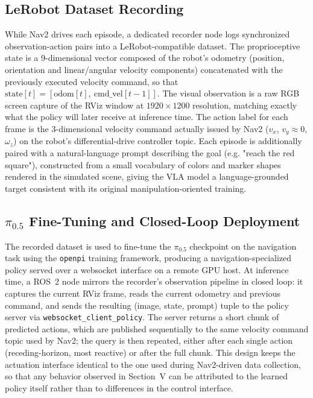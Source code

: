 \documentclass[conference]{IEEEtran}
\begin{document}
\subsection{LeRobot Dataset Recording}
While Nav2 drives each episode, a dedicated recorder node logs synchronized observation-action pairs into a LeRobot-compatible dataset. The proprioceptive state is a 9-dimensional vector composed of the robot's odometry (position, orientation and linear/angular velocity components) concatenated with the previously executed velocity command, so that $\text{state}[t] = [\text{odom}[t],\ \text{cmd\_vel}[t-1]]$. The visual observation is a raw RGB screen capture of the RViz window at $1920\times1200$ resolution, matching exactly what the policy will later receive at inference time. The action label for each frame is the 3-dimensional velocity command actually issued by Nav2 ($v_x$, $v_y \approx 0$, $\omega_z$) on the robot's differential-drive controller topic. Each episode is additionally paired with a natural-language prompt describing the goal (e.g. "reach the red square"), constructed from a small vocabulary of colors and marker shapes rendered in the simulated scene, giving the VLA model a language-grounded target consistent with its original manipulation-oriented training.

\subsection{$\pi_{0.5}$ Fine-Tuning and Closed-Loop Deployment}
The recorded dataset is used to fine-tune the $\pi_{0.5}$ checkpoint on the navigation task using the \texttt{openpi} training framework, producing a navigation-specialized policy served over a websocket interface on a remote GPU host. At inference time, a ROS~2 node mirrors the recorder's observation pipeline in closed loop: it captures the current RViz frame, reads the current odometry and previous command, and sends the resulting (image, state, prompt) tuple to the policy server via \texttt{websocket\_client\_policy}. The server returns a short chunk of predicted actions, which are published sequentially to the same velocity command topic used by Nav2; the query is then repeated, either after each single action (receding-horizon, most reactive) or after the full chunk. This design keeps the actuation interface identical to the one used during Nav2-driven data collection, so that any behavior observed in Section~V can be attributed to the learned policy itself rather than to differences in the control interface.
\end{document}
